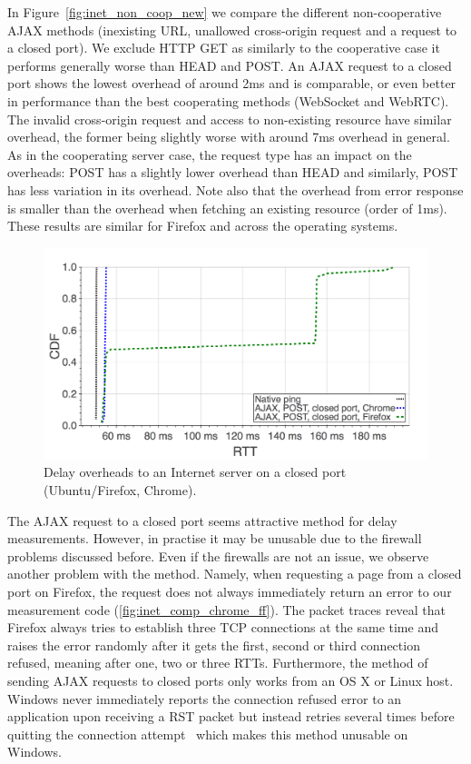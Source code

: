 \documentclass[12pt,twoside]{book}
\begin{document}
In Figure~\ref{fig:inet_non_coop_new} we compare the different non-cooperative AJAX methods (inexisting URL, unallowed cross-origin request and a request to a closed port). We exclude HTTP GET as similarly to the cooperative case it performs generally worse than HEAD and POST. An AJAX request to a closed port shows the lowest overhead of around 2ms and is comparable, or even better in performance than the best cooperating methods (WebSocket and WebRTC). The invalid cross-origin request and access to non-existing resource have similar overhead, the former being slightly worse with around 7ms overhead in general. As in the cooperating server case, the request type has an impact on the overheads: POST has a slightly lower overhead than HEAD and similarly, POST has less variation in its overhead. Note also that the overhead from error response is smaller than the overhead when fetching an existing resource (order of 1ms). These results are similar for Firefox and across the operating systems.


\begin{figure}[h]
\includegraphics[width=\columnwidth]{figures/inet-comp-chrome-ff}
\caption{Delay overheads to an Internet server on a closed port (Ubuntu/Firefox, Chrome).}
\label{fig:inet_comp_chrome_ff}
\end{figure}
\vspace{-2mm}

The AJAX request to a closed port seems attractive method for delay measurements. However, in practise it may be unusable due to the firewall problems discussed before. Even if the firewalls are not an issue, we observe another problem with the method. Namely, when requesting a page from a closed port on Firefox, the request does not always immediately return an error to our measurement code (\autoref{fig:inet_comp_chrome_ff}). The packet traces reveal that Firefox always tries to establish three TCP connections at the same time and raises the error randomly after it gets the first, second or third connection refused, meaning after one, two or three RTTs. Furthermore, the method of sending AJAX requests to closed ports only works from an OS X or Linux host. Windows never immediately reports the connection refused error to an application upon receiving a RST packet but instead retries several times before quitting the connection attempt~\cite{microsoft_tcp_retries} which makes this method unusable on Windows. 
\end{document}
